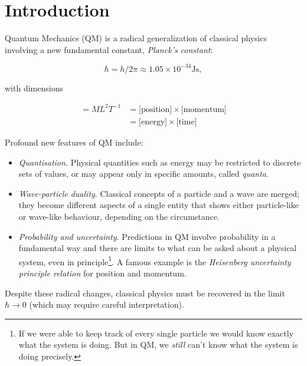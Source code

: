 \documentclass[a4paper]{article}
\begin{document}
\maketitle

\setcounter{section}{-1}
\section{Introduction}




Quantum Mechanics (QM) is a radical generalization of classical physics involving a new fundamental constant, \emph{Planck's constant}:

\[ \hbar = h / 2\pi \approx 1.05 \times 10^{-34} \text{Js},
 \]
 

 
 with dimensions 
 
 \begin{align*}
 [\hbar] = ML^{2} T^{-1} & =  \text{[position]} \times \text{[momentum]} \\
 & =  \text{[energy]} \times \text{[time]}
 \end{align*}
 
 Profound new features of QM include:
 
 \begin{itemize}
 	\item \emph{ Quantisation.} Physical quantities such as energy may be restricted to discrete sets of values, or may appear only in specific amounts, called \emph{quanta}.
 	
 	\item \emph{Wave-particle duality}. Classical concepts of a particle and a wave are merged; they become different aspects of a single entity that shows either particle-like or wave-like behaviour, depending on the circumstance.
 	
 	\item \emph{Probability and uncertainty}. Predictions in QM involve probability in a fundamental way and there are limits to what can be asked about a physical system, even in principle\footnote{If we were able to keep track of every single particle we would know exactly what the system is doing. But in QM, we \emph{still} can't know what the system is doing precisely. }. A famous example is the \emph{Heisenberg uncertainty principle relation} for position and momentum. 
\end{itemize}

Despite these radical changes, classical physics must be recovered in the limit $ \hbar \to 0 $ (which may require careful interpretation).
\end{document}
